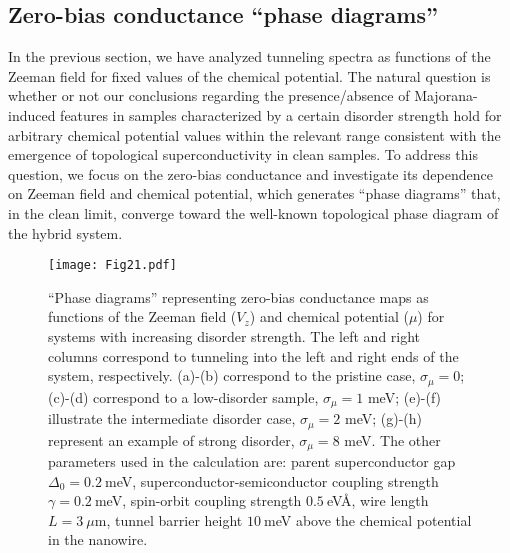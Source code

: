 \documentclass[aps,prmaterials,twocolumn,superscriptaddress,longbibliography]{revtex4-2}
\begin{document}
\subsection{Zero-bias conductance ``phase diagrams'' } \label{SSec3C} %

In the previous section, we have analyzed tunneling spectra as functions of the Zeeman field for fixed values of the chemical potential. The natural question is whether or not our conclusions regarding the presence/absence of Majorana-induced features in samples characterized by a certain disorder strength hold for arbitrary chemical potential values within the relevant range consistent with the emergence of topological superconductivity in clean samples. To address this question, we focus on the zero-bias conductance and investigate its dependence on Zeeman field and chemical potential, which generates ``phase diagrams'' that, in the clean limit,  converge toward the well-known topological phase diagram of the hybrid system.

\begin{figure}[h]
    \centering
    \texttt{[image: Fig21.pdf]}
    \caption{``Phase diagrams'' representing  zero-bias conductance maps as functions of the Zeeman field ($V_z$) and chemical potential ($\mu$) for systems with increasing disorder strength. The left and right columns correspond to tunneling into the left and right ends of the system, respectively.   
   (a)-(b) correspond to the pristine case,  $\sigma_\mu=0$; (c)-(d) correspond to a low-disorder sample, $\sigma_\mu=1$ meV; (e)-(f) illustrate the intermediate disorder case, $\sigma_\mu=2$ meV; (g)-(h) represent an example of strong disorder, $\sigma_\mu=8$ meV. The other parameters used in the calculation are: parent superconductor gap $\Delta_0=0.2~$meV, superconductor-semiconductor coupling strength $\gamma=0.2~$meV, spin-orbit coupling strength $0.5~$eV\AA, wire length $L=3~\mu$m, tunnel barrier height $10~$meV above the chemical potential in the nanowire.}
    \label{fig:21}
\end{figure}
\end{document}

